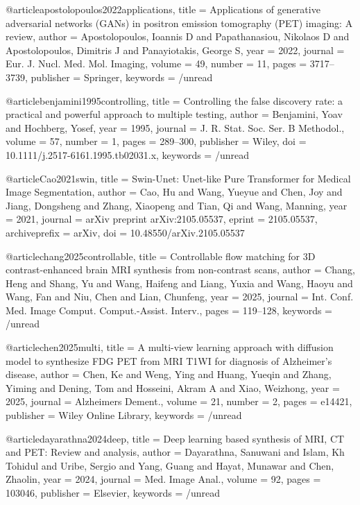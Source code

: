 @article{apostolopoulos2022applications,
  title = {Applications of generative adversarial networks ({{GANs}}) in positron emission tomography ({{PET}}) imaging: {{A}} review},
  author = {Apostolopoulos, Ioannis D and Papathanasiou, Nikolaos D and Apostolopoulos, Dimitris J and Panayiotakis, George S},
  year = 2022,
  journal = {Eur. J. Nucl. Med. Mol. Imaging},
  volume = {49},
  number = {11},
  pages = {3717--3739},
  publisher = {Springer},
  keywords = {/unread}
}

@article{benjamini1995controlling,
  title = {Controlling the false discovery rate: a practical and powerful approach to multiple testing},
  author = {Benjamini, Yoav and Hochberg, Yosef},
  year = 1995,
  journal = {J. R. Stat. Soc. Ser. B Methodol.},
  volume = {57},
  number = {1},
  pages = {289--300},
  publisher = {Wiley},
  doi = {10.1111/j.2517-6161.1995.tb02031.x},
  keywords = {/unread}
}

@article{Cao2021swin,
 title = {Swin-Unet: Unet-like Pure Transformer for Medical Image Segmentation},
 author = {Cao, Hu and Wang, Yueyue and Chen, Joy and Jiang, Dongsheng and Zhang, Xiaopeng and Tian, Qi and Wang, Manning},
 year = {2021},
 journal = {arXiv preprint arXiv:2105.05537},
 eprint = {2105.05537},
 archiveprefix = {arXiv},
 doi = {10.48550/arXiv.2105.05537}
}

@article{chang2025controllable,
  title = {Controllable flow matching for {{3D}} contrast-enhanced brain {{MRI}} synthesis from non-contrast scans},
  author = {Chang, Heng and Shang, Yu and Wang, Haifeng and Liang, Yuxia and Wang, Haoyu and Wang, Fan and Niu, Chen and Lian, Chunfeng},
  year = 2025,
  journal = {Int. Conf. Med. Image Comput. Comput.-Assist. Interv.},
  pages = {119--128},
  keywords = {/unread}
}

@article{chen2025multi,
  title = {A multi-view learning approach with diffusion model to synthesize {{FDG PET}} from {{MRI T1WI}} for diagnosis of {{Alzheimer}}'s disease},
  author = {Chen, Ke and Weng, Ying and Huang, Yueqin and Zhang, Yiming and Dening, Tom and Hosseini, Akram A and Xiao, Weizhong},
  year = 2025,
  journal = {Alzheimers Dement.},
  volume = {21},
  number = {2},
  pages = {e14421},
  publisher = {Wiley Online Library},
  keywords = {/unread}
}

@article{dayarathna2024deep,
  title = {Deep learning based synthesis of {{MRI}}, {{CT}} and {{PET}}: {{Review}} and analysis},
  author = {Dayarathna, Sanuwani and Islam, Kh Tohidul and Uribe, Sergio and Yang, Guang and Hayat, Munawar and Chen, Zhaolin},
  year = 2024,
  journal = {Med. Image Anal.},
  volume = {92},
  pages = {103046},
  publisher = {Elsevier},
  keywords = {/unread}
}

